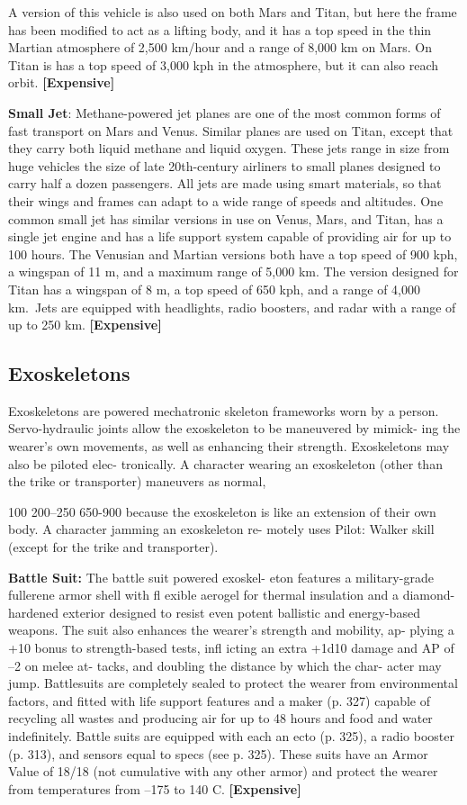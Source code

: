 A version of this vehicle is also used on both Mars 
and Titan, but here the frame has been modified to 
act as a lifting body, and it has a top speed in the thin 
Martian atmosphere of 2,500 km/hour and a range 
of 8,000 km on Mars. On Titan is has a top speed 
of 3,000 kph in the atmosphere, but it can also reach 
orbit. \textbf{[Expensive]}

\textbf{Small Jet}: Methane-powered jet planes are one of 
the most common forms of fast transport on Mars 
and Venus. Similar planes are used on Titan, except 
that they carry both liquid methane and liquid oxygen. 
These jets range in size from huge vehicles the size of 
late 20th-century airliners to small planes designed to 
carry half a dozen passengers. All jets are made using 
smart materials, so that their wings and frames can 
adapt to a wide range of speeds and altitudes. One 
common small jet has similar versions in use on Venus, 
Mars, and Titan, has a single jet engine and has a life 
support system capable of providing air for up to 100 
hours. The Venusian and Martian versions both have 
a top speed of 900 kph, a wingspan of 11 m, and a 
maximum range of 5,000 km. The version designed 
for Titan has a wingspan of 8 m, a top speed of 650 
kph, and a range of 4,000 km. Jets are equipped with 
headlights, radio boosters, and radar with a range of 
up to 250 km. \textbf{[Expensive]}

\subsection{Exoskeletons}

Exoskeletons are powered mechatronic skeleton 
frameworks worn by a person. Servo-hydraulic joints 
allow the exoskeleton to be maneuvered by mimick-
ing the wearer's own movements, as well as enhancing 
their strength. Exoskeletons may also be piloted elec-
tronically. A character wearing an exoskeleton (other 
than the trike or transporter) maneuvers as normal, 

100
200–250
650-900
because the exoskeleton is like an extension of their 
own body. A character jamming an exoskeleton re-
motely uses Pilot: Walker skill (except for the trike 
and transporter).

\textbf{Battle Suit: }The battle suit powered exoskel-
eton features a military-grade fullerene armor shell 
with fl exible aerogel for thermal insulation and a 
diamond-hardened exterior designed to resist even 
potent ballistic and energy-based weapons. The suit 
also enhances the wearer's strength and mobility, ap-
plying a +10 bonus to strength-based tests, infl icting 
an extra +1d10 damage and AP of –2 on melee at-
tacks, and doubling the distance by which the char-
acter may jump. Battlesuits are completely sealed to 
protect the wearer from environmental factors, and 
fitted with life support features and a maker (p. 327) 
capable of recycling all wastes and producing air 
for up to 48 hours and food and water indefinitely. 
Battle suits are equipped with each an ecto (p. 325), 
a radio booster (p. 313), and sensors equal to specs 
(see p. 325). These suits have an Armor Value of 
18/18 (not cumulative with any other armor) and 
protect the wearer from temperatures from –175 to 
140 C. \textbf{[Expensive]}

